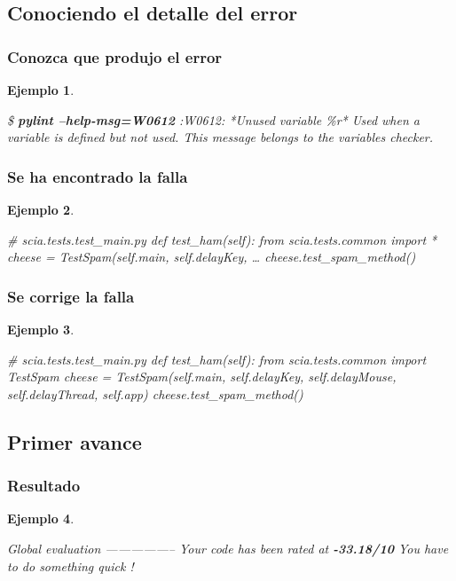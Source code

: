 \documentclass{beamer}
\newtheorem{ejemplo}{Ejemplo}
\begin{document}
\subsection{Conociendo el detalle del error}

\begin{frame}[fragile]
    \frametitle{Conozca que produjo el error}

    \begin{ejemplo}
    \begin{semiverbatim}
\$ \textbf{pylint --help-msg=W0612}
:W0612: *Unused variable \%r*
  Used when a variable is defined 
  but not used. 
  This message belongs to the
  variables checker.
\end{semiverbatim}
    \end{ejemplo}
\end{frame}

\begin{frame}[fragile]
    \frametitle{Se ha encontrado la falla}

\begin{ejemplo}
\tiny
\begin{semiverbatim}
# scia.tests.test\_main.py
def test\_ham(self):
  \alert{from scia.tests.common import *}
  cheese = TestSpam(self.main, self.delayKey, \ldots
  cheese.test\_spam\_method()
\end{semiverbatim}
\end{ejemplo}
\end{frame}

\begin{frame}[fragile]
\frametitle{Se corrige la falla}

\begin{ejemplo}
\small
\begin{semiverbatim}
# scia.tests.test\_main.py
def test\_ham(self):
  {\color{green}from scia.tests.common import TestSpam
  cheese = TestSpam(self.main,
                    self.delayKey,
                    self.delayMouse, 
                    self.delayThread, 
                    self.app)}
  cheese.test\_spam\_method()
\end{semiverbatim}
\end{ejemplo}
\end{frame}

\subsection{Primer avance}

\begin{frame}[fragile]
\frametitle{Resultado}

\begin{ejemplo}
\begin{semiverbatim}

Global evaluation
-----------------
Your code has been rated at \textbf{-33.18/10}
You have to do something quick !
\end{semiverbatim}
\end{ejemplo}
\end{frame}
\end{document}

